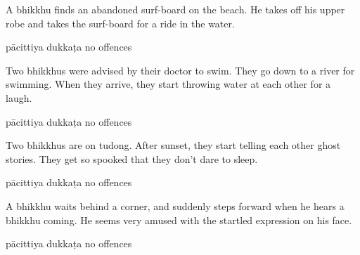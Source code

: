 \begin{exam}{\autoExamName}
\begin{problem*}
\begin{parts}
      \bigskip

      \item A bhikkhu finds an abandoned surf-board on the beach. He takes off his upper
      robe and takes the surf-board for a ride in the water.

      \bigskip

      \begin{answers}{3}
        \bChoices
         pācittiya\eAns
         dukkaṭa\eAns
         no offences\eAns
        \eChoices
      \end{answers}

      \bigskip

      \item Two bhikkhus were advised by their doctor to swim. They go down to a
      river for swimming. When they arrive, they start throwing water at each
      other for a laugh.

      \bigskip

      \begin{answers}{3}
        \bChoices
         pācittiya\eAns
         dukkaṭa\eAns
         no offences\eAns
        \eChoices
      \end{answers}

      \bigskip

      \item Two bhikkhus are on tudong. After sunset, they start telling each
      other ghost stories. They get so spooked that they don't dare to sleep.

      \bigskip

      \begin{answers}{3}
        \bChoices
         pācittiya\eAns
         dukkaṭa\eAns
         no offences\eAns
        \eChoices
      \end{answers}

      \bigskip

      \item A bhikkhu waits behind a corner, and suddenly steps forward when he
      hears a bhikkhu coming. He seems very amused with the startled expression
      on his face.

      \bigskip

      \begin{answers}{3}
        \bChoices
         pācittiya\eAns
         dukkaṭa\eAns
         no offences\eAns
        \eChoices
      \end{answers}

    \end{parts}

  \end{problem*}

\end{exam}
